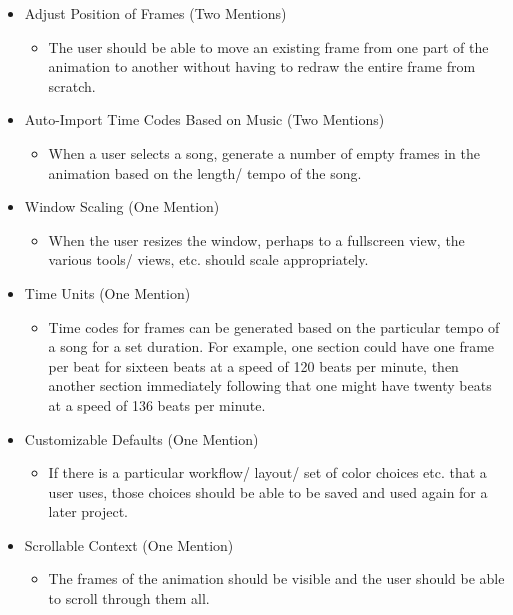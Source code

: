 \documentclass[./spec.tex]{subfiles}
\begin{document}
{\begin{itemize}
\begin{itemize}
		\item A dedicated view/ window displays the playback of the frames as it would appear on the actual tower. This feature could possibly include playback of the music as well, in conjunction with the changing color values so that the entire effect can be previewed.
	\end{itemize}
	\item Adjust Position of Frames (Two Mentions)
	\begin{itemize}
		\item The user should be able to move an existing frame from one part of the animation to another without having to redraw the entire frame from scratch.
	\end{itemize}
	\item Auto-Import Time Codes Based on Music (Two Mentions)
	\begin{itemize}
		\item When a user selects a song, generate a number of empty frames in the animation based on the length/ tempo of the song.
	\end{itemize}
	\item Window Scaling (One Mention)
	\begin{itemize}
		\item When the user resizes the window, perhaps to a fullscreen view, the various tools/ views, etc. should scale appropriately.
	\end{itemize}
	\item Time Units (One Mention)
	\begin{itemize}
		\item Time codes for frames can be generated based on the particular tempo of a song for a set duration. For example, one section could have one frame per beat for sixteen beats at a speed of 120 beats per minute, then another section immediately following that one might have twenty beats at a speed of 136 beats per minute.
	\end{itemize}
	\item Customizable Defaults (One Mention)
	\begin{itemize}
		\item If there is a particular workflow/ layout/ set of color choices etc. that a user uses, those choices should be able to be saved and used again for a later project.
	\end{itemize}
	\item Scrollable Context (One Mention)
	\begin{itemize}
		\item The frames of the animation should be visible and the user should be able to scroll through them all.

\end{itemize}
\end{itemize}}
\end{document}
